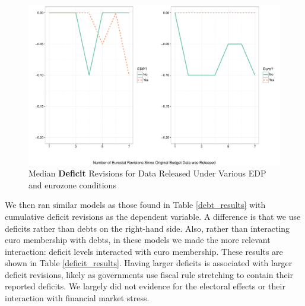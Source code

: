 \documentclass[]{article}
\begin{document}
\begin{figure}
    \begin{center}
        \caption{Median \textbf{Deficit} Revisions for Data Released Under Various EDP and eurozone conditions}
        \label{median_deficit_revisions_euro_edp}
        \includegraphics[scale=0.55]{figures/median_deficit_revisions_edp_euro.pdf}
    \end{center}
\end{figure}


We then ran similar models as those found in Table \ref{debt_results} with cumulative deficit revisions as the dependent variable. A difference is that we use deficits rather than debts on the right-hand side. Also, rather than interacting euro membership with debts, in these models we made the more relevant interaction: deficit levels interacted with euro membership. These results are shown in Table \ref{deficit_results}. Having larger deficits is associated with larger deficit revisions, likely as governments use fiscal rule stretching to contain their reported deficits. We largely did not evidence for the electoral effects or their interaction with financial market stress.

\begin{landscape}
    
\end{landscape}
\end{document}
